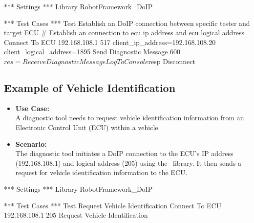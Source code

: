             \begin{robotcode}
*** Settings ***
Library    RobotFramework_DoIP

*** Test Cases ***
Test Establish an DoIP connection between specific tester and target ECU 
    # Establish an connection to ecu ip address and ecu logical address
    Connect To ECU     192.168.108.1      517       client_ip_address=192.168.108.20    client_logical_address=1895
    Send Diagnostic Message     600
    ${res}= Receive Diagnostic Message
    Log To Console    ${resp}
    Disconnect
            \end{robotcode}

    \subsection{Example of Vehicle Identification}
        \begin{itemize}
            \item\textbf{Use Case:}\\
                A diagnostic tool needs to request vehicle identification information from an Electronic Control Unit (ECU) within a vehicle.

            \item\textbf{Scenario:} \\
                The diagnostic tool initiates a DoIP connection to the ECU's IP address (192.168.108.1) and logical address (205) using the 
                \pkg\ library. It then sends a request for vehicle identification information to the ECU.
        \end{itemize}

        \begin{robotcode}
*** Settings ***
Library    RobotFramework_DoIP

*** Test Cases ***
Test Request Vehicle Identification
    Connect To ECU     192.168.108.1      205
    Request Vehicle Identification 

        \end{robotcode}


